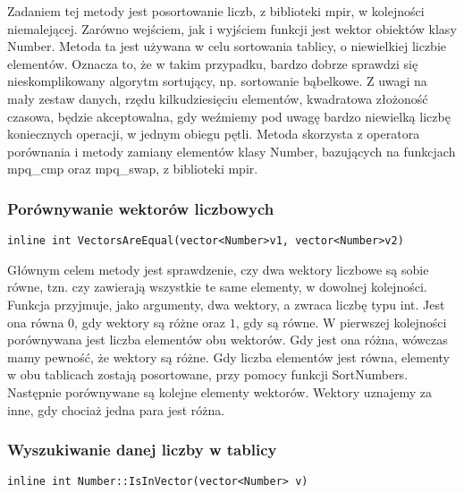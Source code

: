 \documentclass[twoside,a4paper]{book}
\begin{document}
Zadaniem tej metody jest posortowanie liczb, z biblioteki mpir, w kolejności niemalejącej. Zarówno wejściem, jak i wyjściem funkcji jest wektor obiektów klasy Number. Metoda ta jest używana w celu sortowania tablicy, o niewielkiej liczbie elementów. Oznacza to, że w takim przypadku, bardzo dobrze sprawdzi się nieskomplikowany algorytm sortujący, np. sortowanie bąbelkowe. Z uwagi na mały zestaw danych, rzędu kilkudziesięciu elementów, kwadratowa złożoność czasowa, będzie akceptowalna, gdy weźmiemy pod uwagę bardzo niewielką liczbę koniecznych operacji, w jednym obiegu pętli. Metoda skorzysta z operatora porównania i metody zamiany elementów klasy Number, bazujących na funkcjach mpq\_cmp oraz mpq\_swap, z biblioteki mpir.
\\

\subsubsection{Porównywanie wektorów liczbowych}
\begin{lstlisting}
inline int VectorsAreEqual(vector<Number>v1, vector<Number>v2)
\end{lstlisting}

Głównym celem metody jest sprawdzenie, czy dwa wektory liczbowe są sobie równe, tzn. czy zawierają wszystkie te same elementy, w dowolnej kolejności. Funkcja przyjmuje, jako argumenty, dwa wektory, a zwraca liczbę typu int. Jest ona równa $0$, gdy wektory są różne oraz $1$, gdy są równe. W pierwszej kolejności porównywana jest liczba elementów obu wektorów. Gdy jest ona różna, wówczas mamy pewność, że wektory są różne. Gdy liczba elementów jest równa, elementy w obu tablicach zostają posortowane, przy pomocy funkcji SortNumbers. Następnie porównywane są kolejne elementy wektorów. Wektory uznajemy za inne, gdy chociaż jedna para jest różna.
\\

\subsubsection{Wyszukiwanie danej liczby w tablicy}
\begin{lstlisting}
inline int Number::IsInVector(vector<Number> v)
\end{lstlisting}
\end{document}
